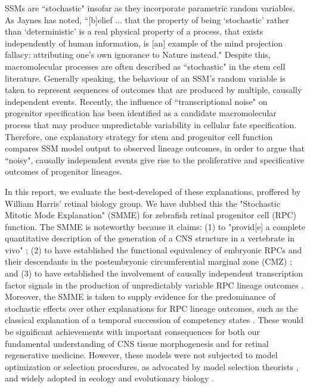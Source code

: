 SSMs are ``stochastic" insofar as they incorporate parametric random variables. As Jaynes has noted, ``[b]elief ... that the property of being ‘stochastic' rather than ‘deterministic' is a real physical property of a process, that exists independently of human information, is [an] example of the mind projection fallacy: attributing one’s own ignorance to Nature instead." \cite{Jaynes2003} Despite this, macromolecular processes are often described as ``stochastic" in the stem cell literature. Generally speaking, the behaviour of an SSM's random variable is taken to represent sequences of outcomes that are produced by multiple, causally independent events. Recently, the influence of ``transcriptional noise" on progenitor specification has been identified as a candidate macromolecular process that may produce unpredictable variability in cellular fate specification. Therefore, one explanatory strategy for stem and progenitor cell function compares SSM model output to observed lineage outcomes, in order to argue that ``noisy", causally independent events give rise to the proliferative and specificative outcomes of progenitor lineages.

In this report, we evaluate the best-developed of these explanations, proffered by William Harris' retinal biology group. We have dubbed this the "Stochastic Mitotic Mode Explanation" (SMME) for zebrafish retinal progenitor cell (RPC) function. The SMME is noteworthy because it claims: (1) to "provid[e] a complete quantitative description of the generation of a CNS structure in a vertebrate in vivo" \cite{He2012}; (2) to have established the functional equivalency of embryonic RPCs and their descendants in the postembryonic circumferential marginal zone (CMZ) \cite{Wan2016}; and (3) to have established the involvement of causally independent transcription factor signals in the production of unpredictably variable RPC lineage outcomes \cite{Boije2015}. Moreover, the SMME is taken to supply evidence for the predominance of stochastic effects over other explanations for RPC lineage outcomes, such as the classical explanation of a temporal succession of competency states \cite{Temple1986}. These would be significant achievements with important consequences for both our fundamental understanding of CNS tissue morphogenesis and for retinal regenerative medicine. However, these models were not subjected to model optimization or selection procedures, as advocated by model selection theorists \cite{Burnham2002}, and widely adopted in ecology and evolutionary biology \cite{Johnson2004}.

